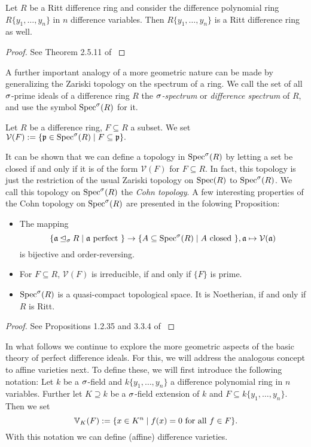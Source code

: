 \begin{theorem}
Let $R$ be a Ritt difference ring and consider the difference polynomial ring $R\{y_1, \ldots, y_n\}$ in $n$ difference variables. Then $R\{y_1, \ldots, y_n\}$ is a Ritt difference ring as well.
\begin{proof} See Theorem 2.5.11 of \cite{levin} \end{proof}
\end{theorem}

A further important analogy of a more geometric nature can be made by generalizing the Zariski topology on the spectrum of a ring. 
We call the set of all $\sigma$-prime ideals of a difference ring $R$ the \emph{$\sigma$-spectrum} or \emph{difference spectrum}  of $R$, and use the symbol $\operatorname{Spec}^\sigma(R)$ for it.

\begin{defn}
Let $R$ be a difference ring, $F \subseteq R$ a subset. We set $\mathcal{V}(F) := \{ \mathfrak{p} \in \operatorname{Spec}^\sigma(R) \mid F \subseteq \mathfrak{p} \}.$
\end{defn}

It can be shown that we can define a topology in $\operatorname{Spec}^\sigma(R)$ by letting a set be closed if and only if it is of the form $\mathcal{V}(F)$ for $F \subseteq R$. 
In fact, this topology is just the restriction of the usual Zariski topology on $\operatorname{Spec}(R)$ to $\operatorname{Spec}^\sigma(R)$.
We call this topology on $\operatorname{Spec}^\sigma(R)$ the \emph{Cohn topology}. A few interesting properties of the Cohn topology on $\operatorname{Spec}^\sigma(R)$ are presented in the folowing Proposition:

\begin{prop}
\begin{itemize}
Let $R$ be a difference ring. Then: 
\item The mapping $$\{ \mathfrak{a} \unlhd_{\sigma} R \mid \mathfrak{a}\text{ perfect }\} \rightarrow \{ A \subseteq \operatorname{Spec}^\sigma(R) \mid A \text{ closed }\}, \mathfrak{a} \mapsto \mathcal{V}(\mathfrak{a})$$
 is bijective and order-reversing.
\item For $F \subseteq R$,  $\mathcal{V}(F)$ is irreducible, if and only if $\{F\}$ is prime.
\item $\operatorname{Spec}^\sigma(R)$ is a quasi-compact topological space. It is Noetherian, if and only if $R$ is Ritt.
\end{itemize}
\begin{proof} See Propositions 1.2.35 and 3.3.4 of \cite{wibmer} \end{proof}
\end{prop}

In what follows we continue to explore the more geometric aspects of the basic theory of perfect difference ideals.
For this, we will address the analogous concept to affine varieties next. To define these, we will first introduce the following notation:
Let $k$ be a $\sigma$-field and $k\{y_1,\ldots,y_n\}$ a difference polynomial ring in $n$ variables. Further let $K \supseteq k$ be a $\sigma$-field extension of $k$ and $F \subseteq k\{y_1,\ldots,y_n\}$.
Then we set $$\mathbb{V}_K(F) := \{ x \in K^n \mid f(x) = 0 \text{ for all } f \in F \}.$$
With this notation we can define (affine) difference varieties.

